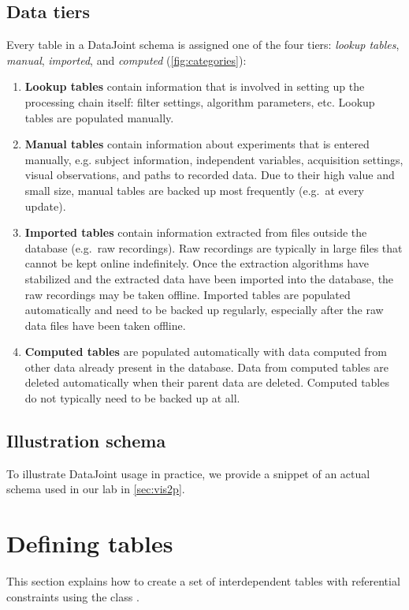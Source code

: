 \documentclass[10pt]{article}
\begin{document}
\subsection{Data tiers}\label{sec:tiers}
Every table in a DataJoint schema is assigned one of the four tiers: {\em lookup tables}, {\em manual}, {\em imported}, and {\em computed}  (\autoref{fig:categories}):
\begin{enumerate}
   \item{\bf Lookup tables} contain information that is involved in setting up the processing chain itself: filter settings, algorithm parameters, etc.  Lookup tables are populated manually.
   \item{\bf Manual tables} contain information about experiments that is entered manually, e.g. subject information, independent variables, acquisition settings, visual observations, and paths to recorded data.  Due to their high value and small size, manual tables are backed up most frequently (e.g.~at every update).
   \item{\bf Imported tables} contain information extracted from  files outside the database (e.g.~raw recordings).  Raw recordings are typically in large files that cannot be kept online indefinitely. Once the extraction algorithms have stabilized and the extracted  data have been imported into the database, the raw recordings may be taken offline.  Imported tables are populated automatically and need to be backed up regularly, especially after the raw data files have been taken offline. 
   \item {\bf Computed tables} are populated automatically with data computed from other data already present in the database.  Data from computed tables are deleted automatically when their parent data are deleted. Computed tables do not typically need to be backed up at all.
\end{enumerate}  


\subsection{Illustration schema}
To illustrate DataJoint usage in practice, we provide a snippet of an actual schema used in our lab in \autoref{sec:vis2p}.


\newpage\section{Defining tables}\label{sec:definition}

This section explains how to create a set of interdependent tables with referential constraints using the class .
\end{document}
